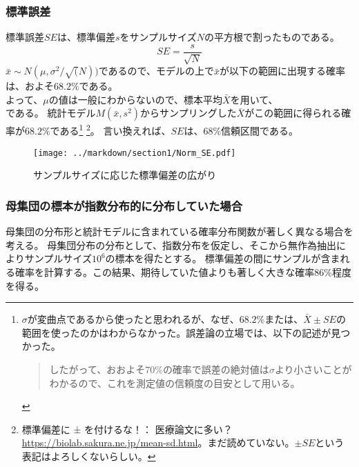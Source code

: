 \documentclass[a4paper,11pt,dvipdfmx]{jsarticle}
\begin{document}
\subsubsection{標準誤差}
標準誤差$SE$は、標準偏差$s$をサンプルサイズ$N$の平方根で割ったものである。
\begin{equation*}
    SE = \frac{s}{\sqrt{N}}
\end{equation*}
$\bar{x}\sim N(\mu,\sigma^2/\sqrt(N))$であるので、モデルの上で$\bar{x}$が以下の範囲に出現する確率は、およそ$68.2\%$である。
\begin{equation*}
    [\bar{\mu}-SE,\bar{\mu}+SE]
\end{equation*}
よって、$\mu$の値は一般にわからないので、標本平均$\bar{X}$を用いて、
\begin{equation*}
    [\bar{X}-SE,\bar{X}+SE]
\end{equation*}
である。
統計モデル$M(\bar{x},s^2)$からサンプリングした$\bar{X}$がこの範囲に得られる確率が$68.2\%$である\footnote{$\sigma$が変曲点であるから使ったと思われるが、なぜ、$68.2\%$または、$\bar{X}\pm SE$の範囲を使ったのかはわからなかった。誤差論の立場では、以下の記述が見つかった\cite{誤差の取り扱い_神戸大学}。
\begin{quote}
    したがって、おおよそ$70\%$の確率で誤差の絶対値は$\sigma$より小さいことがわかるので、これを測定値の信頼度の目安として用いる。
\end{quote}
}
\footnote{標準偏差に ± を付けるな！： 医療論文に多い？
\url{https://biolab.sakura.ne.jp/mean-sd.html}。まだ読めていない。$\pm SE$という表記はよろしくないらしい。}。
言い換えれば、$SE$は、$68\%$信頼区間である。


\begin{figure}
    \begin{center}
        \texttt{[image: ../markdown/section1/Norm\_SE.pdf]}
        \caption{サンプルサイズに応じた標準偏差の広がり}
    \end{center}
\end{figure}
    
\subsubsection{母集団の標本が指数分布的に分布していた場合}
母集団の分布形と統計モデルに含まれている確率分布関数が著しく異なる場合を考える。
母集団分布の分布として、指数分布を仮定し、そこから無作為抽出によりサンプルサイズ$10^6$の標本を得たとする。
標準偏差の間にサンプルが含まれる確率を計算する。この結果、期待していた値よりも著しく大きな確率$86\%$程度を得る。
\end{document}
